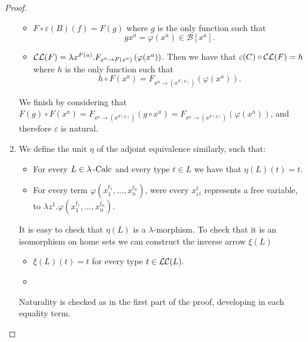 \begin{definition}
\begin{proof}
\begin{enumerate}
\begin{itemize}
\item  $F \circ \varepsilon(B)(f) = F(g)$ where $g$ is the only function  such that$$gx^a = \varphi(x^a) \in \mathcal B[x^a].$$
\item $\mathcal{C}\mathcal{L}(F) = \lambda x^{F(a)}.F_{x^a\to F(x^a)} \left ( \varphi(x^a)\right )$. Then we have that $\varepsilon(C)\circ \mathcal{C}\mathcal{L}(F) = h$ where $h$ is the only function such that $$h\circ F(x^a) = F_{x^a\to (x^{F(a)})}\left ( \varphi(x^a)\right ).$$
\end{itemize}
We finish by considering that $F(g)\circ F(x^a) = F_{x^a\to (x^{F(a)})}(g \circ x^a) = F_{x^a\to (x^{F(a)})}(\varphi(x^a)) $, and therefore $\varepsilon$ is natural.\\

\item[\fbox{$ 1_{\mathcal A}\cong \LL \CC $}] We define the unit $\eta$ of the adjoint equivalence similarly, such that:

  \begin{itemize}
  \item For every $L\in \lambda\operatorname{-Calc}$ and every type $t\in L$ we have that $\eta(L)(t) = t$.
  \item For every term $\varphi (x_1^{t_1},...,x_n^{t_n})$, were every $x_i^t_i$ represents a free variable, to $\lambda z^1. \varphi (x_1^{t_1},...,x_n^{t_n}).$
  \end{itemize}


  It is easy to check that $\eta(L)$ is a $\lambda$-morphism. To check that it is an isomorphism on home sets we can construct the inverse arrow $\xi(L)$

  \begin{itemize}
  \item  $\xi(L)(t) = t$ for every type $t \in \mathcal{L}\mathcal{C}(L).$
  \item  
  \end{itemize}

  Naturality is checked as in the first part of the proof, developing in each equality term. 
\end{enumerate}
\end{proof}

  


\end{definition}
